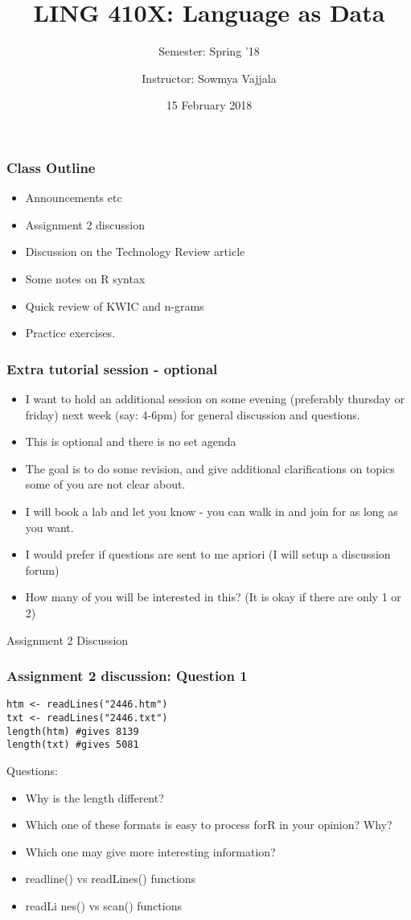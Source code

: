 \documentclass{beamer}
\author[Sowmya Vajjala]{Instructor: Sowmya Vajjala}
\title[LING 410X]{LING 410X: Language as Data}
\subtitle{Semester: Spring '18}
\date{15 February 2018}
\institute{Iowa State University, USA}
\begin{document}
\begin{frame}\titlepage
\end{frame}

\begin{frame}
\frametitle{Class Outline}
\begin{itemize}
\item Announcements etc
\item Assignment 2 discussion
\item Discussion on the Technology Review article
\item Some notes on R syntax
\item Quick review of KWIC and n-grams
\item Practice exercises.
\end{itemize}
\end{frame}

\begin{frame}
\frametitle{Extra tutorial session - optional}
\begin{itemize}
\item I want to hold an additional session on some evening (preferably thursday or friday) next week (say: 4-6pm) for general discussion and questions.
\item This is optional and there is no set agenda
\item The goal is to do some revision, and give additional clarifications on topics some of you are not clear about.
\item I will book a lab and let you know - you can walk in and join for as long as you want.
\item I would prefer if questions are sent to me apriori (I will setup a discussion forum)
\item How many of you will be interested in this? (It is okay if there are only 1 or 2)
\end{itemize}
\end{frame}

\begin{frame}
\Large Assignment 2 Discussion
\end{frame}

\begin{frame}[fragile]
\frametitle{Assignment 2 discussion: Question 1}
\tiny
\begin{verbatim}
htm <- readLines("2446.htm")
txt <- readLines("2446.txt")
length(htm) #gives 8139
length(txt) #gives 5081
\end{verbatim}
\normalsize
Questions:
\begin{itemize}
\item Why is the length different? 
\item Which one of these formats is easy to process forR in your opinion?  Why? 
\item Which one may give more interesting information?
\item readline() vs readLines() functions
\item readLi nes() vs scan() functions
\end{itemize}
\end{frame}
\end{document}
